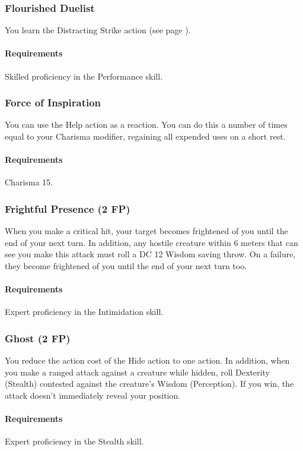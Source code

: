 \subsubsection{Flourished Duelist} \label{feat::flourishedduelist}
    You learn the Distracting Strike action (see page \pageref{act::distractingstrike}).
    \paragraph{Requirements} Skilled proficiency in the Performance skill.
\subsubsection{Force of Inspiration} \label{feat::forceofinspiration}
    You can use the Help action as a reaction.
    You can do this a number of times equal to your Charisma modifier, regaining all expended uses on a short rest.
    \paragraph{Requirements} Charisma 15.
\subsubsection{Frightful Presence (2 FP)} \label{feat::frightfulpresence}
    When you make a critical hit, your target becomes frightened of you until the end of your next turn.
    In addition, any hostile creature within 6 meters that can see you make this attack must roll a DC 12 Wisdom saving throw.
    On a failure, they become frightened of you until the end of your next turn too.
    \paragraph{Requirements} Expert proficiency in the Intimidation skill.
\subsubsection{Ghost (2 FP)} \label{feat::ghost}
    You reduce the action cost of the Hide action to one action.
    In addition, when you make a ranged attack against a creature while hidden, roll Dexterity (Stealth) contested against the creature's Wisdom (Perception).
    If you win, the attack doesn't immediately reveal your position.
    \paragraph{Requirements} Expert proficiency in the Stealth skill.
